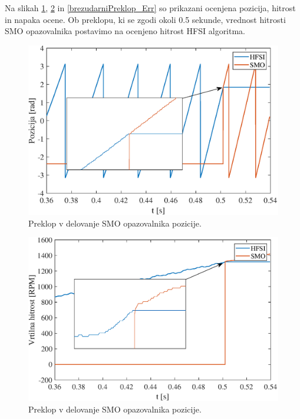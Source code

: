\documentclass[a4paper,twoside,openright,12pt,slovene]{book}
\begin{document}
Na slikah \ref{brezudarniPreklop_Pos}, \ref{brezudarniPreklop_Speed} in \ref{brezudarniPreklop_Err} so prikazani ocenjena pozicija, hitrost in napaka ocene. Ob preklopu, ki se zgodi okoli 0.5 sekunde,
vrednost hitrosti SMO opazovalnika postavimo na ocenjeno hitrost HFSI algoritma.

\begin{figure}[!htbp]
    \centering
    \includegraphics[width=0.8\columnwidth]{Slike/brezudarniPreklop_Pos.eps}
    \caption{\label{brezudarniPreklop_Pos} Preklop v delovanje SMO opazovalnika pozicije. }
\end{figure}

\begin{figure}[!htbp]
    \centering
    \includegraphics[width=0.8\columnwidth]{Slike/brezudarniPreklop_Speed.eps}
    \caption{\label{brezudarniPreklop_Speed} Preklop v delovanje SMO opazovalnika pozicije. }
\end{figure}
\end{document}

